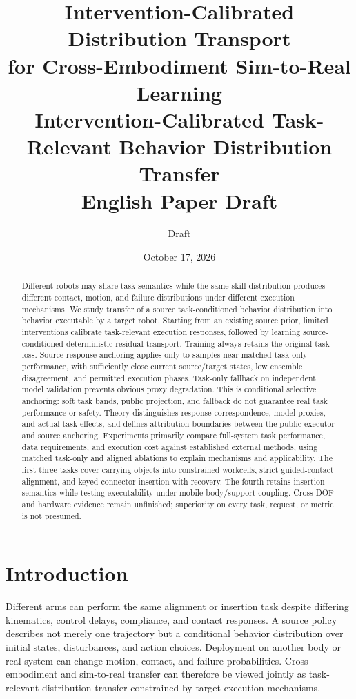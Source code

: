 \documentclass[11pt]{article}
\title{\vspace{-1em}\textbf{Intervention-Calibrated Distribution Transport\\for Cross-Embodiment Sim-to-Real Learning}\\[0.6em]
\large Intervention-Calibrated Task-Relevant Behavior Distribution Transfer\\[0.4em]
\normalsize English Paper Draft}
\author{Draft}
\date{October 17, 2026}
\begin{document}
\maketitle
\vspace{-1em}
\begin{abstract}
Different robots may share task semantics while the same skill distribution produces different contact, motion, and failure distributions under different execution mechanisms. We study transfer of a source task-conditioned behavior distribution into behavior executable by a target robot. Starting from an existing source prior, limited interventions calibrate task-relevant execution responses, followed by learning source-conditioned deterministic residual transport. Training always retains the original task loss. Source-response anchoring applies only to samples near matched task-only performance, with sufficiently close current source/target states, low ensemble disagreement, and permitted execution phases. Task-only fallback on independent model validation prevents obvious proxy degradation. This is conditional selective anchoring: soft task bands, public projection, and fallback do not guarantee real task performance or safety. Theory distinguishes response correspondence, model proxies, and actual task effects, and defines attribution boundaries between the public executor and source anchoring. Experiments primarily compare full-system task performance, data requirements, and execution cost against established external methods, using matched task-only and aligned ablations to explain mechanisms and applicability. The first three tasks cover carrying objects into constrained workcells, strict guided-contact alignment, and keyed-connector insertion with recovery. The fourth retains insertion semantics while testing executability under mobile-body/support coupling. Cross-DOF and hardware evidence remain unfinished; superiority on every task, request, or metric is not presumed.
\end{abstract}
\tableofcontents
\newpage

\section{Introduction}
\label{sec:intro}
Different arms can perform the same alignment or insertion task despite differing kinematics, control delays, compliance, and contact responses. A source policy describes not merely one trajectory but a conditional behavior distribution over initial states, disturbances, and action choices. Deployment on another body or real system can change motion, contact, and failure probabilities. Cross-embodiment and sim-to-real transfer can therefore be viewed jointly as task-relevant distribution transfer constrained by target execution mechanisms.
\end{document}
